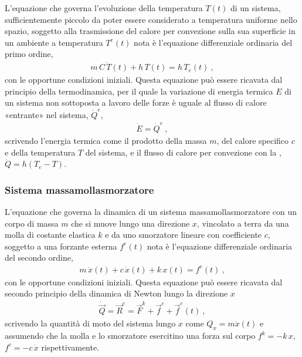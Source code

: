 \documentclass[letterpaper,10pt,italian]{jupyterBook}
\begin{document}
\sphinxAtStartPar
{} L’equazione che governa l’evoluzione della temperatura \(T(t)\) di un sistema, sufficientemente piccolo da poter essere considerato a temperatura uniforme nello spazio, soggetto alla trasmissione del calore per convezione sulla sua superficie in un ambiente a temperatura \(T^e(t)\) nota è l’equazione differenziale ordinaria del primo ordine,
\begin{equation*}
\begin{split}m \, C \, \dot{T}(t) + h \, T(t) = h \, T_e(t) \ ,\end{split}
\end{equation*}
\sphinxAtStartPar
con le opportune condizioni iniziali.
Questa equazione può essere ricavata dal principio della termodinamica, per il quale la variazione di energia termica \(E\) di un sistema non sottoposta a lavoro delle forze è uguale al flusso di calore «entrante» nel sistema, \(\dot{Q}^e\),
\begin{equation*}
\begin{split}\dot{E} = \dot{Q}^e \ ,\end{split}
\end{equation*}
\sphinxAtStartPar
scrivendo l’energia termica come il prodotto della massa \(m\), del calore specifico \(c\) e della temperatura \(T\) del sistema, e il flusso di calore per convezione con la , \(\dot{Q} = h (T_e - T)\).
\subsubsection*{Sistema massa\sphinxhyphen{}molla\sphinxhyphen{}smorzatore}

\sphinxAtStartPar
{} L’equazione che governa la dinamica di un sistema massa\sphinxhyphen{}molla\sphinxhyphen{}smorzatore con un corpo di massa \(m\) che si muove lungo una direzione \(x\), vincolato a terra da una molla di costante elastica \(k\) e da uno smorzatore lineare con coefficiente \(c\), soggetto a una forzante esterna \(f^e(t)\) nota è l’equazione differenziale ordinaria del secondo ordine,
\begin{equation*}
\begin{split}m \, \ddot{x}(t) + c \, \dot{x}(t) + k \, x(t) = f^e(t) \ ,\end{split}
\end{equation*}
\sphinxAtStartPar
con le opportune condizioni iniziali.
Questa equazione può essere ricavata dal secondo principio della dinamica di Newton lungo la direzione \(x\)
\begin{equation*}
\begin{split}\dot{\vec{Q}} = \vec{R}^e = \vec{F}^k + \vec{f}^c + \vec{f}^e(t) \ ,\end{split}
\end{equation*}
\sphinxAtStartPar
scrivendo la quantità di moto del sistema lungo \(x\) come \(Q_x = m \dot{x}(t)\) e assumendo che la molla e lo smorzatore esercitino una forza sul corpo \(f^{k} = - k \, x\), \(f^c = - c \, \dot{x}\) rispettivamente.
\end{document}
